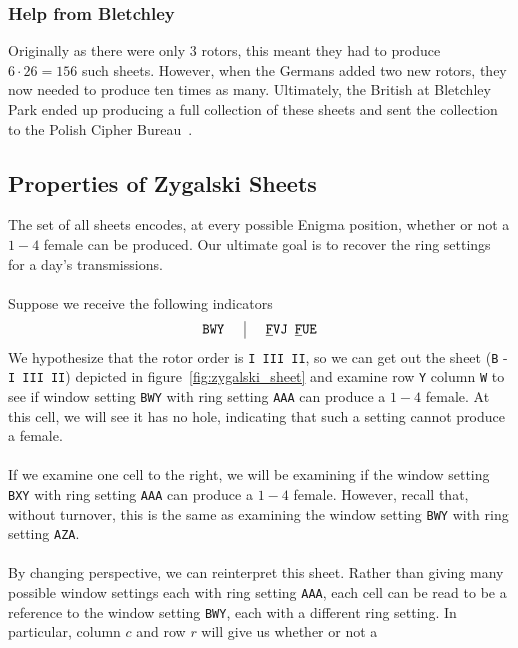 \subsubsection{Help from Bletchley}
Originally as there were only $3$ rotors, this meant they had to
produce $6\cdot 26 = 156$ such sheets. However, when the Germans
added two new rotors, they now needed to produce ten times as many.
Ultimately, the British at Bletchley Park ended up producing a full
collection of these sheets and sent the collection to the Polish Cipher Bureau~\cite[p.~228]{Rejewski1981}.

\subsection{Properties of Zygalski Sheets}
The set of all sheets encodes, at every possible Enigma position,
whether or not a $1-4$ female can be produced. Our ultimate goal is
to recover the ring settings for a day's transmissions.
\\\\Suppose we receive the following indicators
\[
  \setlength{\arraycolsep}{15pt}
  \begin{array}{c | c}
    \texttt{BWY} & {\uline{\texttt{F}}}\texttt{VJ
    }{\uline{\texttt{F}}}\texttt{UE}              \\
  \end{array}
\]
We hypothesize that the rotor order is \texttt{I III II}, so we
can get out the sheet (\texttt{B} - \texttt{I III II}) depicted in
figure~\ref{fig:zygalski_sheet} and examine row \texttt{Y} column
\texttt{W} to see if window setting \texttt{BWY} with ring
setting \texttt{AAA} can produce a $1-4$ female. At this cell, we will
see it has no hole, indicating that such a setting cannot produce a female.
\\\\If we examine one cell to the right, we will be examining if the
window setting \texttt{BXY} with ring setting \texttt{AAA} can
produce a $1-4$ female. However, recall that, without turnover, this
is the same as examining the window setting \texttt{BWY} with ring
setting \texttt{AZA}.
\\\\By changing perspective, we can reinterpret this sheet. Rather than
giving many possible window settings each with ring setting
\texttt{AAA}, each cell can be read to be a reference to the window
setting \texttt{BWY}, each with a different ring setting. In
particular, column $c$ and row $r$ will give us whether or not a
